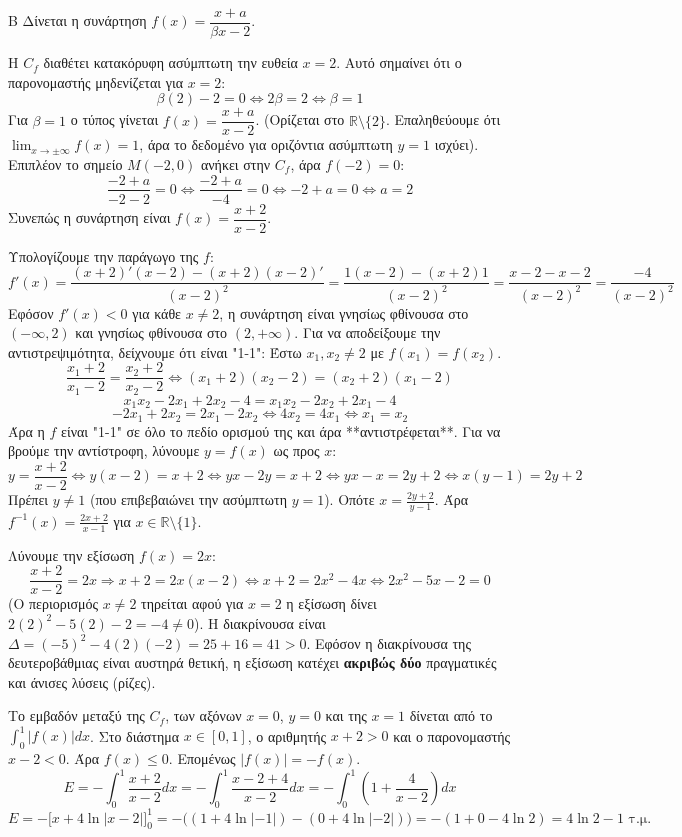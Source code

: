\begin{thema}{Β}
Δίνεται η συνάρτηση $f(x) = \dfrac{x+a}{\beta x-2}$.
\begin{erwthma}
\item Η $C_f$ διαθέτει κατακόρυφη ασύμπτωτη την ευθεία $x=2$. 
Αυτό σημαίνει ότι ο παρονομαστής μηδενίζεται για $x=2$:
\[ \beta(2) - 2 = 0 \Leftrightarrow 2\beta = 2 \Leftrightarrow \beta = 1 \]
Για $\beta=1$ ο τύπος γίνεται $f(x) = \dfrac{x+a}{x-2}$. 
(Ορίζεται στο $\mathbb{R} \setminus \{2\}$. Επαληθεύουμε ότι $\lim_{x\to\pm\infty} f(x) = 1$, άρα το δεδομένο για οριζόντια ασύμπτωτη $y=1$ ισχύει).
Επιπλέον το σημείο $M(-2, 0)$ ανήκει στην $C_f$, άρα $f(-2) = 0$:
\[ \frac{-2+a}{-2-2} = 0 \Leftrightarrow \frac{-2+a}{-4} = 0 \Leftrightarrow -2+a = 0 \Leftrightarrow a = 2 \]
Συνεπώς η συνάρτηση είναι $f(x) = \dfrac{x+2}{x-2}$.

\item Υπολογίζουμε την παράγωγο της $f$:
\[ f'(x) = \frac{(x+2)'(x-2) - (x+2)(x-2)'}{(x-2)^2} = \frac{1(x-2) - (x+2)1}{(x-2)^2} = \frac{x-2-x-2}{(x-2)^2} = \frac{-4}{(x-2)^2} \]
Εφόσον $f'(x) < 0$ για κάθε $x \neq 2$, η συνάρτηση είναι γνησίως φθίνουσα στο $(-\infty, 2)$ και γνησίως φθίνουσα στο $(2, +\infty)$.
Για να αποδείξουμε την αντιστρεψιμότητα, δείχνουμε ότι είναι "1-1":
Έστω $x_1, x_2 \ne 2$ με $f(x_1) = f(x_2)$. 
\[ \frac{x_1+2}{x_1-2} = \frac{x_2+2}{x_2-2} \Leftrightarrow (x_1+2)(x_2-2) = (x_2+2)(x_1-2) \]
\[ x_1 x_2 - 2x_1 + 2x_2 - 4 = x_1 x_2 - 2x_2 + 2x_1 - 4 \]
\[ -2x_1 + 2x_2 = 2x_1 - 2x_2 \Leftrightarrow 4x_2 = 4x_1 \Leftrightarrow x_1 = x_2 \]
Άρα η $f$ είναι "1-1" σε όλο το πεδίο ορισμού της και άρα **αντιστρέφεται**.
Για να βρούμε την αντίστροφη, λύνουμε $y = f(x)$ ως προς $x$:
\[ y = \frac{x+2}{x-2} \Leftrightarrow y(x-2) = x+2 \Leftrightarrow yx - 2y = x + 2 \Leftrightarrow yx - x = 2y + 2 \Leftrightarrow x(y-1) = 2y + 2 \]
Πρέπει $y \ne 1$ (που επιβεβαιώνει την ασύμπτωτη $y=1$).
Οπότε $x = \frac{2y+2}{y-1}$.
Άρα $f^{-1}(x) = \frac{2x+2}{x-1}$ για $x \in \mathbb{R} \setminus \{1\}$.

\item Λύνουμε την εξίσωση $f(x) = 2x$:
\[ \frac{x+2}{x-2} = 2x \Rightarrow x+2 = 2x(x-2) \Leftrightarrow x+2 = 2x^2 - 4x \Leftrightarrow 2x^2 - 5x - 2 = 0 \]
(Ο περιορισμός $x \ne 2$ τηρείται αφού για $x=2$ η εξίσωση δίνει $2(2)^2 - 5(2) - 2 = -4 \ne 0$).
Η διακρίνουσα είναι $\Delta = (-5)^2 - 4(2)(-2) = 25 + 16 = 41 > 0$.
Εφόσον η διακρίνουσα της δευτεροβάθμιας είναι αυστηρά θετική, η εξίσωση κατέχει \textbf{ακριβώς δύο} πραγματικές και άνισες λύσεις (ρίζες).

\item Το εμβαδόν μεταξύ της $C_f$, των αξόνων $x=0$, $y=0$ και της $x=1$ δίνεται από το $\int_0^1 |f(x)|dx$.
Στο διάστημα $x \in [0, 1]$, ο αριθμητής $x+2 > 0$ και ο παρονομαστής $x-2 < 0$. 
Άρα $f(x) \le 0$. Επομένως $|f(x)| = -f(x)$.
\[ E = - \int_0^1 \frac{x+2}{x-2} dx = - \int_0^1 \frac{x-2+4}{x-2} dx = - \int_0^1 \left( 1 + \frac{4}{x-2} \right) dx \]
\[ E = - \Big[ x + 4\ln|x-2| \Big]_0^1 = - \big( (1 + 4\ln|-1|) - (0 + 4\ln|-2|) \big) = - (1 + 0 - 4\ln 2) = 4\ln 2 - 1 \text{ τ.μ.} \]
\end{erwthma}
\end{thema}
